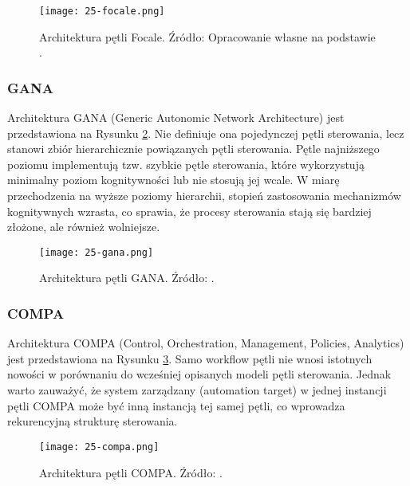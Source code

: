 \begin{figure}[!h]
    \centering \texttt{[image: 25-focale.png]}
    \caption{Architektura pętli Focale. Źródło: Opracowanie własne na podstawie \cite{etsieni2024}.}\label{fig:25-focale}
\end{figure}

\subsubsection{GANA}
Architektura GANA (Generic Autonomic Network Architecture) \cite{etsigana2018} jest przedstawiona na Rysunku \ref{fig:25-gana}. Nie definiuje ona pojedynczej pętli sterowania, lecz stanowi zbiór hierarchicznie powiązanych pętli sterowania. Pętle najniższego poziomu implementują tzw. szybkie pętle sterowania, które wykorzystują minimalny poziom kognitywności lub nie stosują jej wcale. W miarę przechodzenia na wyższe poziomy hierarchii, stopień zastosowania mechanizmów kognitywnych wzrasta, co sprawia, że procesy sterowania stają się bardziej złożone, ale również wolniejsze.

\begin{figure}[!h]
    \centering \texttt{[image: 25-gana.png]}
    \caption{Architektura pętli GANA. Źródło: \cite{etsieni2024}.}\label{fig:25-gana}
\end{figure}

\subsubsection{COMPA}
Architektura COMPA (Control, Orchestration, Management, Policies, Analytics) \cite{doyle2014} jest przedstawiona na Rysunku \ref{fig:25-compa}. Samo workflow pętli nie wnosi istotnych nowości w porównaniu do wcześniej opisanych modeli pętli sterowania. Jednak warto zauważyć, że system zarządzany (automation target) w jednej instancji pętli COMPA może być inną instancją tej samej pętli, co wprowadza rekurencyjną strukturę sterowania.

\begin{figure}[!h]
    \centering \texttt{[image: 25-compa.png]}
    \caption{Architektura pętli COMPA. Źródło: \cite{etsieni2024}.}\label{fig:25-compa}
\end{figure}

